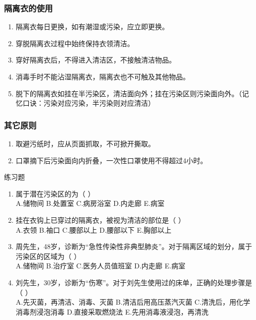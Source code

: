 \documentclass[11pt, a4paper]{ctexart}
\begin{document}
\subsubsection{隔离衣的使用}
\begin{enumerate}
	\item 隔离衣每日更换，如有潮湿或污染，应立即更换。
	\item 穿脱隔离衣过程中始终保持衣领清洁。
	\item 穿好隔离衣后，不得进入清洁区，不接触清洁物品。
	\item 消毒手时不能沾湿隔离衣，隔离衣也不可触及其他物品。
	\item 脱下的隔离衣如挂在半污染区，清洁面向外；挂在污染区则污染面向外。（记忆口诀：污染对应污染，半污染则对应清洁）
\end{enumerate}

\subsubsection{其它原则}
\begin{enumerate}
	\item 取避污纸时，应从页面抓取，不可掀开撕取。
	\item 口罩摘下后污染面向内折叠，一次性口罩使用不得超过4小时。
\end{enumerate}

\begin{examplebox}{练习题}
	\begin{enumerate}
		\item 属于潜在污染区的为（ ）\\
		      A.储物间 \quad B.处置室 \quad C.病房浴室 \quad D.内走廊 \quad E.病室
		\item 挂在衣钩上已穿过的隔离衣，被视为清洁的部位是（ ）\\
		      A.衣领 \quad B.袖口 \quad C.腰部以上 \quad D.腰部以下 \quad E.胸部以上
		\item 周先生，48岁，诊断为“急性传染性非典型肺炎”。对于隔离区域的划分，属于污染区的区域为（ ）\\
		      A.储物间 \quad B.治疗室 \quad C.医务人员值班室 \quad D.内走廊 \quad E.病室
		\item 刘先生，30岁，诊断为“伤寒”。对于刘先生使用过的床单，正确的处理步骤是（ ）\\
		      A.先灭菌，再清洁、消毒、灭菌 \quad B.清洁后用高压蒸汽灭菌 \quad C.清洗后，用化学消毒剂浸泡消毒 \quad D.直接采取燃烧法 \quad E.先用消毒液浸泡，再清洗
	\end{enumerate}
\end{examplebox}
\end{document}
